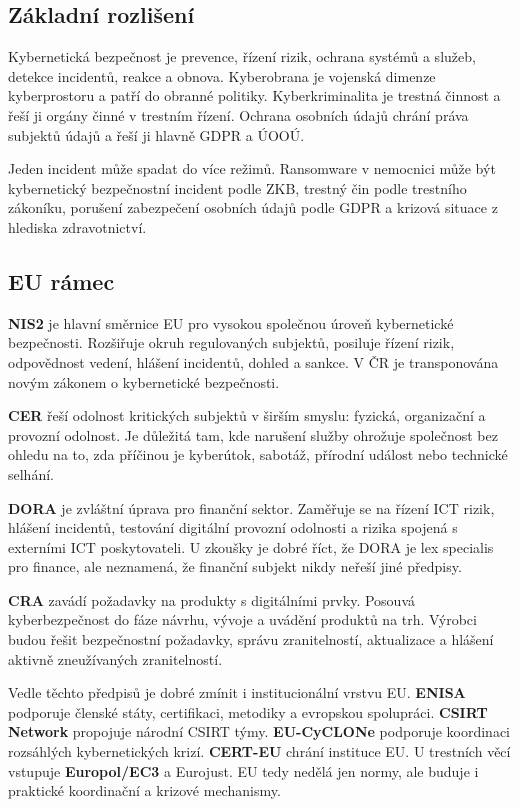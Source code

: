 \documentclass[11pt,a4paper]{article}
\begin{document}
\subsection*{Základní rozlišení}
Kybernetická bezpečnost je prevence, řízení rizik, ochrana systémů a služeb, detekce incidentů, reakce a obnova. Kyberobrana je vojenská dimenze kyberprostoru a patří do obranné politiky. Kyberkriminalita je trestná činnost a řeší ji orgány činné v trestním řízení. Ochrana osobních údajů chrání práva subjektů údajů a řeší ji hlavně GDPR a ÚOOÚ.

Jeden incident může spadat do více režimů. Ransomware v nemocnici může být kybernetický bezpečnostní incident podle ZKB, trestný čin podle trestního zákoníku, porušení zabezpečení osobních údajů podle GDPR a krizová situace z hlediska zdravotnictví.

\subsection*{EU rámec}
\textbf{NIS2} je hlavní směrnice EU pro vysokou společnou úroveň kybernetické bezpečnosti. Rozšiřuje okruh regulovaných subjektů, posiluje řízení rizik, odpovědnost vedení, hlášení incidentů, dohled a sankce. V ČR je transponována novým zákonem o kybernetické bezpečnosti.

\textbf{CER} řeší odolnost kritických subjektů v širším smyslu: fyzická, organizační a provozní odolnost. Je důležitá tam, kde narušení služby ohrožuje společnost bez ohledu na to, zda příčinou je kyberútok, sabotáž, přírodní událost nebo technické selhání.

\textbf{DORA} je zvláštní úprava pro finanční sektor. Zaměřuje se na řízení ICT rizik, hlášení incidentů, testování digitální provozní odolnosti a rizika spojená s externími ICT poskytovateli. U zkoušky je dobré říct, že DORA je lex specialis pro finance, ale neznamená, že finanční subjekt nikdy neřeší jiné předpisy.

\textbf{CRA} zavádí požadavky na produkty s digitálními prvky. Posouvá kyberbezpečnost do fáze návrhu, vývoje a uvádění produktů na trh. Výrobci budou řešit bezpečnostní požadavky, správu zranitelností, aktualizace a hlášení aktivně zneužívaných zranitelností.

Vedle těchto předpisů je dobré zmínit i institucionální vrstvu EU. \textbf{ENISA} podporuje členské státy, certifikaci, metodiky a evropskou spolupráci. \textbf{CSIRT Network} propojuje národní CSIRT týmy. \textbf{EU-CyCLONe} podporuje koordinaci rozsáhlých kybernetických krizí. \textbf{CERT-EU} chrání instituce EU. U trestních věcí vstupuje \textbf{Europol/EC3} a Eurojust. EU tedy nedělá jen normy, ale buduje i praktické koordinační a krizové mechanismy.
\end{document}
